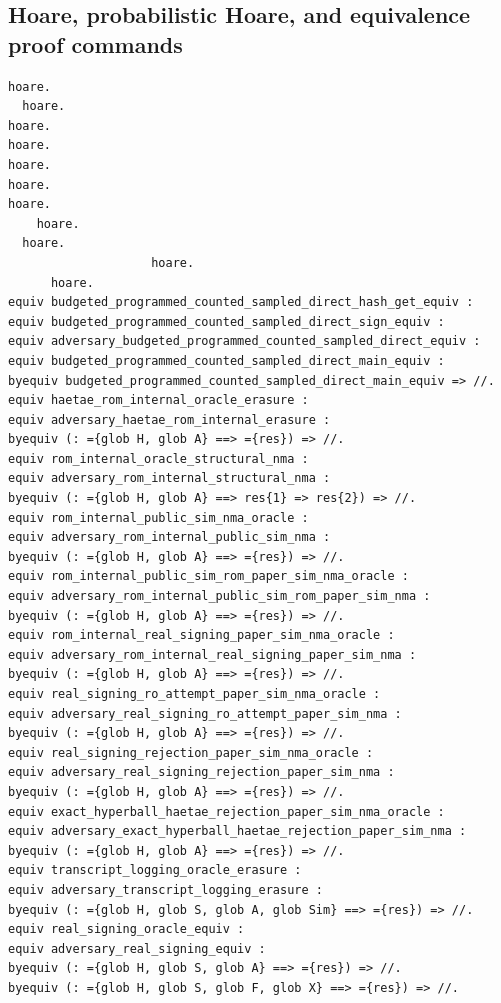 \subsection*{Hoare, probabilistic Hoare, and equivalence proof commands}
\begin{lstlisting}[language=EasyCrypt,basicstyle=\ttfamily\tiny]
    hoare.
  hoare.
hoare.
hoare.
hoare.
hoare.
hoare.
    hoare.
  hoare.
				    hoare.
	  hoare.
equiv budgeted_programmed_counted_sampled_direct_hash_get_equiv :
equiv budgeted_programmed_counted_sampled_direct_sign_equiv :
equiv adversary_budgeted_programmed_counted_sampled_direct_equiv :
equiv budgeted_programmed_counted_sampled_direct_main_equiv :
byequiv budgeted_programmed_counted_sampled_direct_main_equiv => //.
equiv haetae_rom_internal_oracle_erasure :
equiv adversary_haetae_rom_internal_erasure :
byequiv (: ={glob H, glob A} ==> ={res}) => //.
equiv rom_internal_oracle_structural_nma :
equiv adversary_rom_internal_structural_nma :
byequiv (: ={glob H, glob A} ==> res{1} => res{2}) => //.
equiv rom_internal_public_sim_nma_oracle :
equiv adversary_rom_internal_public_sim_nma :
byequiv (: ={glob H, glob A} ==> ={res}) => //.
equiv rom_internal_public_sim_rom_paper_sim_nma_oracle :
equiv adversary_rom_internal_public_sim_rom_paper_sim_nma :
byequiv (: ={glob H, glob A} ==> ={res}) => //.
equiv rom_internal_real_signing_paper_sim_nma_oracle :
equiv adversary_rom_internal_real_signing_paper_sim_nma :
byequiv (: ={glob H, glob A} ==> ={res}) => //.
equiv real_signing_ro_attempt_paper_sim_nma_oracle :
equiv adversary_real_signing_ro_attempt_paper_sim_nma :
byequiv (: ={glob H, glob A} ==> ={res}) => //.
equiv real_signing_rejection_paper_sim_nma_oracle :
equiv adversary_real_signing_rejection_paper_sim_nma :
byequiv (: ={glob H, glob A} ==> ={res}) => //.
equiv exact_hyperball_haetae_rejection_paper_sim_nma_oracle :
equiv adversary_exact_hyperball_haetae_rejection_paper_sim_nma :
byequiv (: ={glob H, glob A} ==> ={res}) => //.
equiv transcript_logging_oracle_erasure :
equiv adversary_transcript_logging_erasure :
byequiv (: ={glob H, glob S, glob A, glob Sim} ==> ={res}) => //.
equiv real_signing_oracle_equiv :
equiv adversary_real_signing_equiv :
byequiv (: ={glob H, glob S, glob A} ==> ={res}) => //.
byequiv (: ={glob H, glob S, glob F, glob X} ==> ={res}) => //.
\end{lstlisting}

\section*{}

